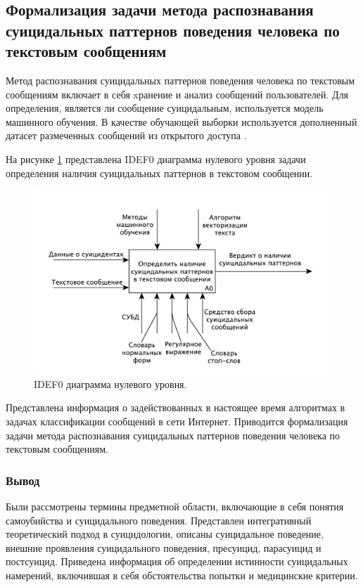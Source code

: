 \subsection{Формализация задачи метода распознавания суицидальных паттернов поведения человека по текстовым сообщениям}

Метод распознавания суицидальных паттернов поведения человека по текстовым сообщениям включает в себя xранение и анализ сообщений пользователей. Для определения, является ли сообщение суицидальным, используется модель машинного обучения. В качестве обучающей выборки используется дополненный датасет размеченных сообщений из открытого доступа \cite{dataset}.

На рисунке \ref{img:idef0} представлена IDEF0 диаграмма нулевого уровня задачи определения наличия суицидальных паттернов в текстовом сообщении.

\begin{figure}[H]
	\centering
	\includegraphics[width=\textwidth]{inc/A0.pdf}
	\caption{ IDEF0 диаграмма нулевого уровня. }
	\label{img:idef0}
\end{figure}


Представлена информация о задействованных в настоящее время алгоритмах в задачах классификации сообщений в сети Интернет.
Приводится формализация задачи метода распознавания суицидальных паттернов поведения человека по текстовым сообщениям.
\subsubsection*{Вывод}

Были рассмотрены термины предметной области, включающие в себя понятия самоубийства и суицидального поведения. 
Представлен интегративный теоретический подход в суицидологии, описаны суицидальное поведение, внешние проявления суицидального поведения, пресуицид, парасуицид и постсуицид. 
Приведена информация об определении истинности суицидальных намерений, включившая в себя обстоятельства попытки и медицинские критерии. 

